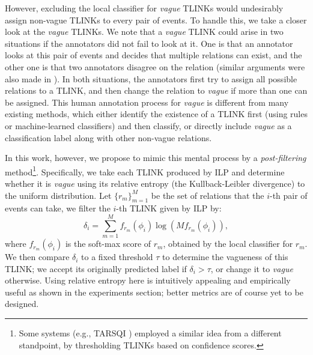 \documentclass[11pt,letterpaper]{article}
\newcommand{\ignore}[1]{}
\newcommand{\final}[1]{#1}
\begin{document}
{However, excluding the local classifier for {\em vague} TLINKs would undesirably assign non-vague TLINKs to every pair of events. To handle this, we take a closer look at the {\em vague} TLINKs.
\final{We note that a {\em vague} TLINK could arise in two situations if the annotators did not fail to look at it.}
One is that an annotator looks at this pair of events and decides that multiple relations can exist, and the other one is that two annotators disagree on the relation (similar arguments were also made in \citet{cassidy2014annotation}).
In both situations, the annotators first try to assign all possible relations to a TLINK, and then change the relation to {\em vague} if more than one \final{can be} assigned.
This human annotation process for {\em vague} is different from many existing methods, which either identify the existence of a TLINK first (using rules or machine-learned classifiers) and then classify, or directly include {\em vague} as a classification label along with other non-vague relations.

In this work, however, we propose to mimic this \final{mental} process by a {\em post-filtering} method\footnote{Some systems (e.g., TARSQI \citep{verhagen2008temporal}) \final{employed a} similar idea from a different standpoint, by thresholding TLINKs based on confidence scores.}.
Specifically, \final{we} take each TLINK produced by ILP and determine whether it is {\em vague} using its relative entropy (the Kullback-Leibler divergence) to the uniform distribution. Let $\{r_m\}_{m=1}^{M}$ be the set of relations that the $i$-th pair of events can take, we filter the $i$-th TLINK given by ILP by:     
$$
\delta_i=\sum_{m=1}^M{f_{r_m}(\phi_i) \log{\left(M f_{r_m}(\phi_i)\right)}},
$$
where $f_{r_m}(\phi_i)$ is the soft-max score of $r_m$, obtained by the local classifier for $r_m$.
We then compare $\delta_i$ to a fixed threshold $\tau$ to determine the vagueness of this TLINK; \final{we} accept its originally predicted label if $\delta_i>\tau$, or  change it to {\em vague} otherwise.
Using relative entropy here is intuitively appealing and empirically useful as shown in the experiments section; better metrics are of course yet to be designed.

\ignore{
This process is intuitively appealing and is different to many existing methods, which either identify the existence of a TLINK first (using rules or machine-learned classifiers) and then classify, or directly include {\em vague} as a classification label along with other non-vague relations.
This post-filtering strategy thus provides us with a new perspective to treating {\em vague} TLINKs in temporal relation extraction.
This new perspective towards treating {\em vague} TLINKs gives rise to the {\em post-filtering} method, in contrast to the aforementioned ``pre-filtering'' method.
}


}
\end{document}
